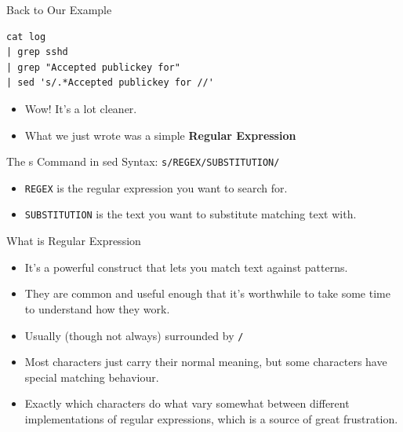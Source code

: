 \documentclass[12pt]{beamer}
\begin{document}
\begin{frame}[fragile]{Back to Our Example}
  \begin{verbatim}
cat log
| grep sshd
| grep "Accepted publickey for"
| sed 's/.*Accepted publickey for //'
  \end{verbatim}
  \begin{itemize}
    \item Wow! It's a lot cleaner.
    \item What we just wrote was a simple \textbf{Regular Expression}
  \end{itemize}
\end{frame}

\begin{frame}{The s Command in sed}
  Syntax: \texttt{s/REGEX/SUBSTITUTION/}
  \begin{itemize}
    \item \texttt{REGEX} is the regular expression you want to search for.
    \item \texttt{SUBSTITUTION} is the text you want to substitute matching text with.
  \end{itemize}
\end{frame}

\begin{frame}{What is Regular Expression}
  \begin{itemize}
    \item It's a powerful construct that lets you match text against patterns.
    \item They are common and useful enough that it’s worthwhile to take some time to understand how they work.
    \item Usually (though not always) surrounded by \texttt{/}
    \item Most characters just carry their normal meaning, but some characters have special matching behaviour.
    \item Exactly which characters do what vary somewhat between different implementations of regular expressions, which is a source of great frustration.
  \end{itemize}
\end{frame}
\end{document}

